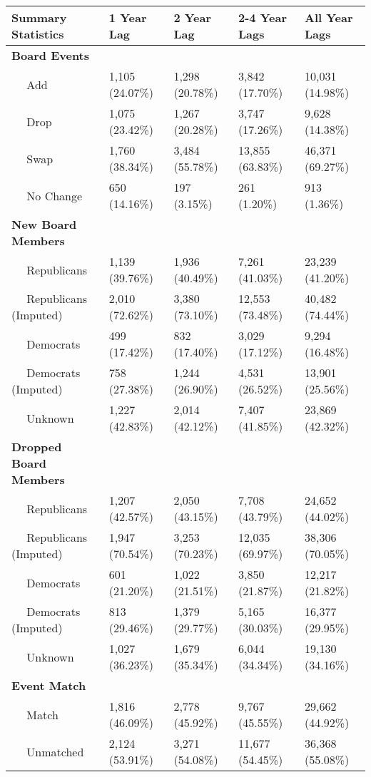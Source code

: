 
\begin{tabular}{l|l|l|l|l}
\hline
Summary Statistics & 1 Year Lag & 2 Year Lag & 2-4 Year Lags & All Year Lags\\
\hline
\bf{Board Events} & ~ & ~ & ~ & ~\\
\hline
~~ Add & 1,105 (24.07\%) & 1,298 (20.78\%) & 3,842 (17.70\%) & 10,031 (14.98\%)\\
\hline
~~ Drop & 1,075 (23.42\%) & 1,267 (20.28\%) & 3,747 (17.26\%) & 9,628 (14.38\%)\\
\hline
~~ Swap & 1,760 (38.34\%) & 3,484 (55.78\%) & 13,855 (63.83\%) & 46,371 (69.27\%)\\
\hline
~~ No Change & 650 (14.16\%) & 197 (3.15\%) & 261 (1.20\%) & 913 (1.36\%)\\
\hline
\bf{New Board Members} & ~ & ~ & ~ & ~\\
\hline
~~ Republicans & 1,139 (39.76\%) & 1,936 (40.49\%) & 7,261 (41.03\%) & 23,239 (41.20\%)\\
\hline
~~ Republicans (Imputed) & 2,010 (72.62\%) & 3,380 (73.10\%) & 12,553 (73.48\%) & 40,482 (74.44\%)\\
\hline
~~ Democrats & 499 (17.42\%) & 832 (17.40\%) & 3,029 (17.12\%) & 9,294 (16.48\%)\\
\hline
~~ Democrats (Imputed) & 758 (27.38\%) & 1,244 (26.90\%) & 4,531 (26.52\%) & 13,901 (25.56\%)\\
\hline
~~ Unknown & 1,227 (42.83\%) & 2,014 (42.12\%) & 7,407 (41.85\%) & 23,869 (42.32\%)\\
\hline
\bf{Dropped Board Members} & ~ & ~ & ~ & ~\\
\hline
~~ Republicans & 1,207 (42.57\%) & 2,050 (43.15\%) & 7,708 (43.79\%) & 24,652 (44.02\%)\\
\hline
~~ Republicans (Imputed) & 1,947 (70.54\%) & 3,253 (70.23\%) & 12,035 (69.97\%) & 38,306 (70.05\%)\\
\hline
~~ Democrats & 601 (21.20\%) & 1,022 (21.51\%) & 3,850 (21.87\%) & 12,217 (21.82\%)\\
\hline
~~ Democrats (Imputed) & 813 (29.46\%) & 1,379 (29.77\%) & 5,165 (30.03\%) & 16,377 (29.95\%)\\
\hline
~~ Unknown & 1,027 (36.23\%) & 1,679 (35.34\%) & 6,044 (34.34\%) & 19,130 (34.16\%)\\
\hline
\bf{Event Match} & ~ & ~ & ~ & ~\\
\hline
~~ Match & 1,816 (46.09\%) & 2,778 (45.92\%) & 9,767 (45.55\%) & 29,662 (44.92\%)\\
\hline
~~ Unmatched & 2,124 (53.91\%) & 3,271 (54.08\%) & 11,677 (54.45\%) & 36,368 (55.08\%)\\

\end{tabular}
